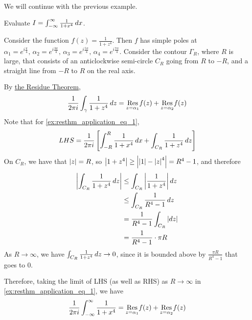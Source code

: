 \documentclass[11pt, oneside]{book}
\begin{document}
We will continue with the previous example.

\begin{ex}
  Evaluate $I = \int_{-\infty}^{\infty} \frac{1}{1 + x^4} \dif{x}$.

  Consider the function $f(z) = \frac{1}{1 + z^4}$. Then $f$ has simple poles at $\alpha_1 = e^{i \frac{\pi}{4} }, \, \alpha_2 = e^{i \frac{3 \pi}{4} }, \, \alpha_3 = e^{i \frac{5 \pi}{4} }, \, \alpha_4 = e^{i \frac{7 \pi}{4} }$. Consider the contour $\Gamma_R$, where $R$ is large, that consists of an anticlockwise semi-circle $C_R$ going from $R$ to $-R$, and a straight line from $-R$ to $R$ on the real axis.

  By \hyperref[thm:cauchy_s_residue_theorem_generalized]{the Residue Theorem},
  \begin{equation}\label{ex:resthm_application_eq_1}
    \frac{1}{2 \pi i} \int_{\gamma} \frac{1}{1 + z^4} \dif{z} = \res{f(z)}{z = \alpha_1} + \res{f(z)}{z = \alpha_2}
  \end{equation}
  Note that for \cref{ex:resthm_application_eq_1},
  \begin{equation*}
    LHS = \frac{1}{2 \pi i} \left[ \int_{-R}^{R} \frac{1}{1 + x^4} \dif{x} + \int_{C_R} \frac{1}{1 + z^4} \dif{z} \right] 
  \end{equation*}
  On $C_R$, we have that $\abs{z} = R$, so $\abs{1 + z^4} \geq \abs{\abs{1} - \abs{z}^4} = R^4 - 1$, and therefore
  \begin{align*}
    \abs{\int_{C_R} \frac{1}{1 + z^4} \dif{z} }
      &\leq \int_{C_R} \abs{\frac{1}{1 + z^4} } \dif{z} \\
      &\leq \int_{C_R} \frac{1}{R^4 - 1} \dif{z} \\
      &= \frac{1}{R^4 - 1} \int_{C_R} \abs{\dif{z}} \\
      &= \frac{1}{R^4 - 1} \cdot \pi R
  \end{align*}
  As $R \to \infty$, we have $\int_{C_R} \frac{1}{1 + z^4} \dif{z} \to 0$, since it is bounded above by $\frac{\pi R}{R^4 - 1}$ that goes to $0$.

  Therefore, taking the limit of LHS (as well as RHS) as $R \to \infty$ in \cref{ex:resthm_application_eq_1}, we have
  \begin{equation*}
    \frac{1}{2 \pi i} \int_{-\infty}^{\infty} \frac{1}{1 + x^4} = \res{f(z)}{z = \alpha_1} + \res{f(z)}{z = \alpha_2}
  \end{equation*}


\end{ex}
\end{document}

